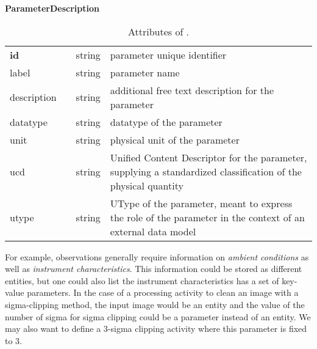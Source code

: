 \begin{table}[ht]
\small
{}\textwidth
\textbf{\normalsize ParameterDescription}\vspace{0.25em}\\
\begin{tabulary}{1.0\textwidth}{@{}p{0cm}p{2.5cm}lL@{}}
\toprule
{} & \head{} &  & \\
\midrule
\textbf{id}  & & string & parameter unique identifier\\
label         & & string & parameter name\\
description & & string & additional free text description for the parameter\\
datatype    & & string & datatype of the parameter \\
unit           & & string & physical unit of the parameter\\
ucd           & & string  & Unified Content Descriptor for the parameter, supplying a standardized classification of the physical quantity\\
utype        & & string  & UType of the parameter, meant to express the role of the parameter in the context of an external data model \\
\bottomrule
\end{tabulary}
\caption{Attributes of .}
\end{table}

For example, observations generally require information on \emph{ambient conditions} as well as 
\emph{instrument characteristics}. This information could be stored as different entities, but one could also list the instrument characteristics has a set of key-value parameters. In the case of a processing activity to clean an image with a sigma-clipping method, the input image would be an entity and the value of the number of sigma for sigma clipping could be a parameter instead of an entity. We may also want to define a 3-sigma clipping activity where this parameter is fixed to 3.


